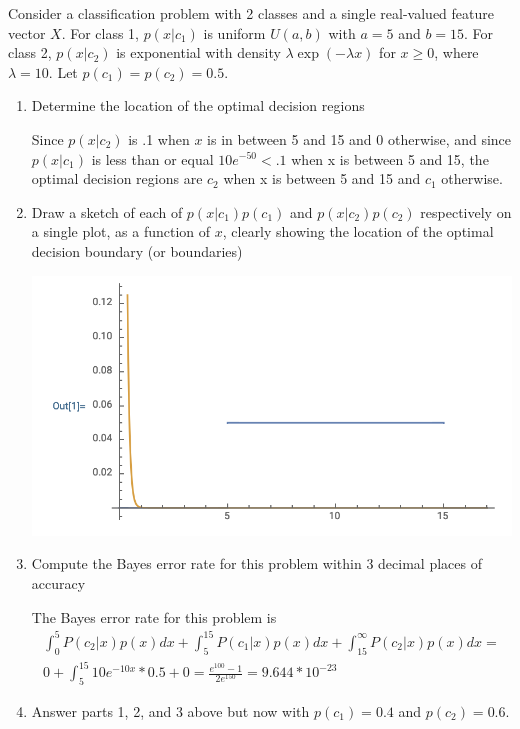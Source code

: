 \documentclass[11pt]{article}
\begin{document}
Consider a classification problem  with 2 classes and a single real-valued feature vector $X$.
For class 1, $p(x|c_1)$ is uniform $U(a,b)$  with $a=5$ and $b=15$. For class 2, $p(x|c_2)$ is exponential with density $\lambda \exp(-\lambda x)$ for $x \ge 0$, where $\lambda=10$. Let $p(c_1) = p(c_2) = 0.5$.
\begin{enumerate}
\item Determine the location of the optimal decision regions

Since $p(x|c_2)$ is .1 when $x$ is in between 5 and 15 and 0 otherwise, and since $p(x|c_1)$ is less than or equal $10e^{-50} < .1$ when x is between 5 and 15, the optimal decision regions are $c_2$ when x is between 5 and 15 and $c_1$ otherwise.

\item Draw a sketch of  each of $p(x|c_1)p(c_1)$ and $p(x|c_2)p(c_2)$ respectively on a single plot, as a function of $x$, clearly showing the location of the optimal decision boundary (or boundaries)

\includegraphics[scale=0.5]{graph1.png}

\item Compute the Bayes error rate for this problem within 3 decimal places of accuracy

The Bayes error rate for this problem is 
\begin{multline}
	\int_0^5 P(c_2|x)p(x) dx + \int_5^{15} P(c_1|x)p(x) dx + \int_{15}^\infty P(c_2|x)p(x)dx = \\
	0 + \int_5^{15} 10e^{-10x}*0.5 + 0 = \frac{e^{100}-1}{2e^{150}} = 9.644*10^{-23}
\end{multline}

\item Answer parts 1, 2, and 3 above but now with $p(c_1) = 0.4$ and $p(c_2) = 0.6$.


\end{enumerate}
\end{document}
